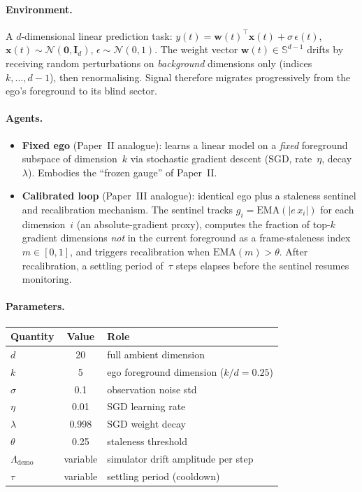 \documentclass[12pt,a4paper,openany]{book}
\begin{document}
\paragraph{Environment.}
A $d$-dimensional linear prediction task:
$y(t) = \mathbf{w}(t)^\top \mathbf{x}(t)
+ \sigma\,\epsilon(t)$,
$\mathbf{x}(t) \sim \mathcal{N}(\mathbf{0}, \mathbf{I}_d)$,
$\epsilon \sim \mathcal{N}(0,1)$.
The weight vector $\mathbf{w}(t) \in \mathbb{S}^{d-1}$
drifts by receiving random perturbations on
\emph{background} dimensions only (indices $k,\ldots,d{-}1$),
then renormalising.  Signal therefore migrates progressively
from the ego's foreground to its blind sector.

\paragraph{Agents.}
\begin{itemize}
\item \textbf{Fixed ego} (Paper~II analogue):
  learns a linear model on a \emph{fixed} foreground
  subspace of dimension~$k$ via stochastic gradient descent
  (SGD, rate~$\eta$, decay~$\lambda$).
  Embodies the ``frozen gauge'' of Paper~II.
\item \textbf{Calibrated loop} (Paper~III analogue):
  identical ego plus a staleness sentinel and recalibration
  mechanism.
  The sentinel tracks $g_i = \mathrm{EMA}(|e\,x_i|)$ for
  each dimension~$i$ (an absolute-gradient proxy),
  computes the fraction of top-$k$ gradient dimensions
  \emph{not} in the current foreground as a frame-staleness
  index $m \in [0,1]$, and triggers
  recalibration when
  $\mathrm{EMA}(m) > \theta$.
  After recalibration, a settling period
  of~$\tau$ steps elapses before the sentinel resumes
  monitoring.
\end{itemize}

\paragraph{Parameters.}
\begin{center}
\small
\begin{tabular}{@{}lcl@{}}
\toprule
\textbf{Quantity} & \textbf{Value} & \textbf{Role} \\
\midrule
$d$ & 20 & full ambient dimension \\
$k$ & 5  & ego foreground dimension ($k/d = 0.25$) \\
$\sigma$ & 0.1 & observation noise std \\
$\eta$ & 0.01 & SGD learning rate \\
$\lambda$ & 0.998 & SGD weight decay \\
$\theta$ & 0.25 & staleness threshold \\
$\Lambda_{\mathrm{demo}}$ & variable & simulator drift amplitude per step \\
$\tau$ & variable & settling period (cooldown) \\
\bottomrule
\end{tabular}
\end{center}
\end{document}
